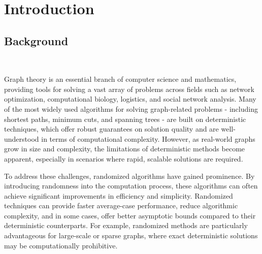 \documentclass[11pt]{article}
\theoremstyle{plain}
\begin{document}
\tableofcontents

\newpage
\section{Introduction}
\subsection{Background}\

Graph theory is an essential branch of computer science and mathematics, providing tools for solving a vast array of problems across fields such as network optimization, computational biology, logistics, and social network analysis. Many of the most widely used algorithms for solving graph-related problems - including shortest paths, minimum cuts, and spanning trees - are built on deterministic techniques, which offer robust guarantees on solution quality and are well-understood in terms of computational complexity. However, as real-world graphs grow in size and complexity, the limitations of deterministic methods become apparent, especially in scenarios where rapid, scalable solutions are required.

To address these challenges, randomized algorithms have gained prominence. By introducing randomness into the computation process, these algorithms can often achieve significant improvements in efficiency and simplicity. Randomized techniques can provide faster average-case performance, reduce algorithmic complexity, and in some cases, offer better asymptotic bounds compared to their deterministic counterparts. For example, randomized methods are particularly advantageous for large-scale or sparse graphs, where exact deterministic solutions may be computationally prohibitive.

\end{document}
